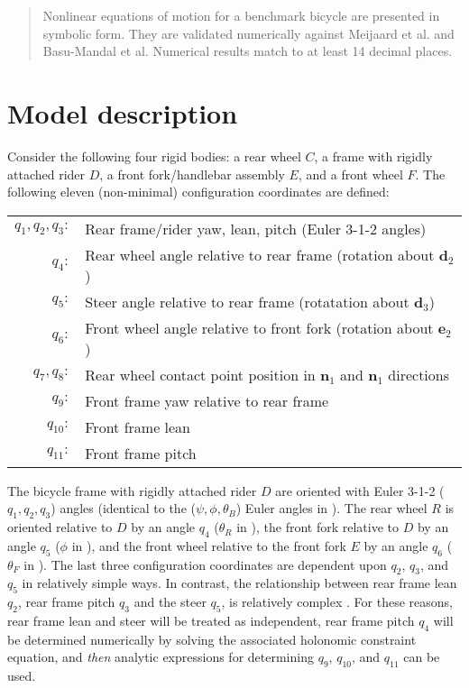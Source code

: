 \documentclass[letterpaper,11pt]{article}
\newcommand{\bs}[1]{ \boldsymbol{ #1 } }
\begin{document}
\begin{abstract}

  Nonlinear equations of motion for a benchmark bicycle are presented in
  symbolic form.  They are validated numerically against Meijaard et al. and
  Basu-Mandal et al.  Numerical results match to at least 14 decimal places.

\end{abstract}

\section*{Model description}
\label{sec:model_description}
Consider the following four rigid bodies: a rear wheel $C$, a frame with
rigidly attached rider $D$, a front fork/handlebar assembly $E$, and a front
wheel $F$.
The following eleven (non-minimal) configuration coordinates are defined:
\begin{table}[h]
  \begin{center}
    \begin{tabular}{rl}
      $q_1, q_2, q_3:$ & Rear frame/rider yaw, lean, pitch (Euler 3-1-2 angles) \\
      $q_4:$ & Rear wheel angle relative to rear frame (rotation about $\bs{d}_2$)\\
      $q_5:$ & Steer angle relative to rear frame (rotatation about $\bs{d}_3$) \\
      $q_6:$ & Front wheel angle relative to front fork (rotation about
      $\bs{e}_2$)\\
      $q_7, q_8:$ & Rear wheel contact point position in $\bs{n}_1$ and
      $\bs{n}_1$ directions\\
      $q_9:$ & Front frame yaw relative to rear frame \\
      $q_{10}:$ & Front frame lean \\
      $q_{11}:$ & Front frame pitch
    \end{tabular}
  \end{center}
\end{table}

The bicycle frame with rigidly attached rider $D$ are oriented with Euler 3-1-2
($q_1, q_2, q_3$) angles (identical to the ($\psi, \phi, \theta_B$) Euler
angles in \cite{Meijaard2007}).  The rear wheel $R$ is oriented relative to $D$
by an angle $q_4$ ($\theta_R$ in \cite{Meijaard2007}), the front fork relative
to $D$ by an angle $q_5$ ($\phi$ in \cite{Meijaard2007}), and the front wheel
relative to the front fork $E$ by an angle $q_6$ ($\theta_F$ in
\cite{Meijaard2007}).  The last three configuration coordinates are dependent
upon $q_2$, $q_3$, and $q_5$ in relatively simple ways.  In contrast, the
relationship between rear frame lean $q_2$, rear frame pitch $q_3$ and the
steer $q_5$, is relatively complex \cite{Peterson2008a}.  For these reasons,
rear frame lean and steer will be treated as independent, rear frame pitch
$q_4$ will be determined numerically by solving the associated holonomic
constraint equation, and {\it{then}} analytic expressions for determining
$q_9$, $q_{10}$, and $q_{11}$ can be used.
\end{document}
